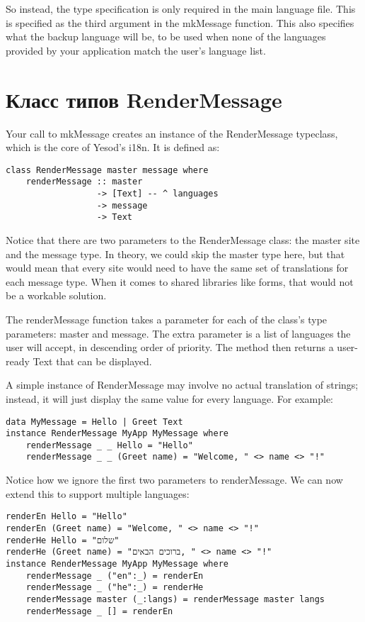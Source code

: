 So instead, the type specification is only required in the main language file. This is specified as the third argument in the mkMessage function. This also specifies what the backup language will be, to be used when none of the languages provided by your application match the user's language list.

\section{Класс типов RenderMessage} %

Your call to mkMessage creates an instance of the RenderMessage typeclass, which is the core of Yesod's i18n. It is defined as:
\begin{lstlisting}
class RenderMessage master message where
    renderMessage :: master
                  -> [Text] -- ^ languages
                  -> message
                  -> Text 
\end{lstlisting}

Notice that there are two parameters to the RenderMessage class: the master site and the message type. In theory, we could skip the master type here, but that would mean that every site would need to have the same set of translations for each message type. When it comes to shared libraries like forms, that would not be a workable solution.

The renderMessage function takes a parameter for each of the class's type parameters: master and message. The extra parameter is a list of languages the user will accept, in descending order of priority. The method then returns a user-ready Text that can be displayed.

A simple instance of RenderMessage may involve no actual translation of strings; instead, it will just display the same value for every language. For example:

\begin{lstlisting}
data MyMessage = Hello | Greet Text
instance RenderMessage MyApp MyMessage where
    renderMessage _ _ Hello = "Hello"
    renderMessage _ _ (Greet name) = "Welcome, " <> name <> "!"
\end{lstlisting}
    
Notice how we ignore the first two parameters to renderMessage. We can now extend this to support multiple languages:

\begin{lstlisting}
renderEn Hello = "Hello"
renderEn (Greet name) = "Welcome, " <> name <> "!"
renderHe Hello = "שלום"
renderHe (Greet name) = "ברוכים הבאים, " <> name <> "!"
instance RenderMessage MyApp MyMessage where
    renderMessage _ ("en":_) = renderEn
    renderMessage _ ("he":_) = renderHe
    renderMessage master (_:langs) = renderMessage master langs
    renderMessage _ [] = renderEn
\end{lstlisting}

